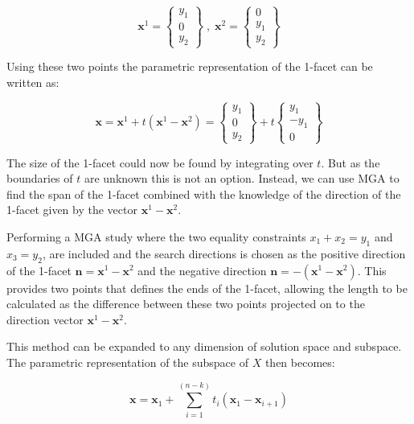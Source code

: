 \begin{equation*}
\mathbf{x}^1 = 
\begin{Bmatrix}
y_1 \\
0 \\
y_2
\end{Bmatrix}
\; , \; \mathbf{x}^2 = 
\begin{Bmatrix}
0 \\
y_1 \\
y_2
\end{Bmatrix}
\end{equation*}

Using these two points the parametric representation of the 1-facet can be written as:

\begin{equation}\label{eq:1-facet}
\mathbf{x} = \mathbf{x}^1 + t \left(\mathbf{x}^1-\mathbf{x}^2  \right)
=
\begin{Bmatrix}
y_1 \\
0 \\
y_2
\end{Bmatrix}
+t    
\begin{Bmatrix}
y_1 \\
-y_1 \\
0
\end{Bmatrix}    
\end{equation}

The size of the 1-facet could now be found by integrating over $t$. But as the boundaries of $t$ are unknown this is not an option. Instead, we can use MGA to find the span of the 1-facet combined with the knowledge of the direction of the 1-facet given by the vector $\mathbf{x}^1 - \mathbf{x}^2$. 

Performing a MGA study where the two equality constraints $ x_1 + x_2 = y_1$ and $x_3 = y_2 $, are included and the search directions is chosen as the positive direction of the 1-facet $\mathbf{n} = \mathbf{x}^1 - \mathbf{x}^2$ and the negative direction $\mathbf{n} = -(\mathbf{x}^1 - \mathbf{x}^2)$. This provides two points that defines the ends of the 1-facet, allowing the length to be calculated as the difference between these two points projected on to the direction vector $\mathbf{x}^1 - \mathbf{x}^2$.

This method can be expanded to any dimension of solution space and subspace. The parametric representation of the subspace of $X$ then becomes:

\begin{equation}
\mathbf{x} = \mathbf{x}_1 + \sum_{i=1}^{(n-k)} t_i (\mathbf{x}_1-\mathbf{x}_{i+1})
\end{equation}

